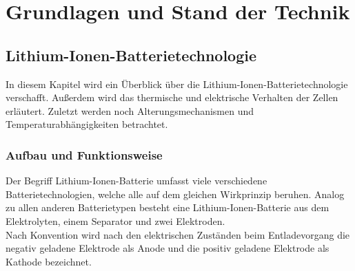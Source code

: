 \section{Grundlagen und Stand der Technik}\label{sec:GrundlagenUSdT}

\subsection{Lithium-Ionen-Batterietechnologie}\label{subsec:LIB}

In diesem Kapitel wird ein Überblick über die Lithium-Ionen-Batterietechnologie verschafft. Außerdem wird das thermische und elektrische Verhalten der Zellen erläutert. Zuletzt werden noch Alterungsmechanismen und Temperaturabhängigkeiten betrachtet.

\subsubsection*{Aufbau und Funktionsweise}\label{subsec*:LIBAufbau}

Der Begriff Lithium-Ionen-Batterie umfasst viele verschiedene Batterietechnologien, welche alle auf dem gleichen Wirkprinzip beruhen. Analog zu allen anderen Batterietypen besteht eine Lithium-Ionen-Batterie aus dem Elektrolyten, einem Separator und zwei Elektroden.\\
Nach Konvention wird nach den elektrischen Zuständen beim Entladevorgang die negativ geladene Elektrode als Anode und die positiv geladene Elektrode als Kathode bezeichnet.\\

